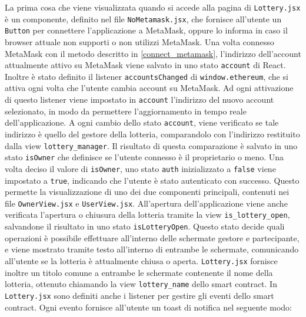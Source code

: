 \documentclass[12pt,a4paper,openright,twoside]{report}
\begin{document}
La prima cosa che viene visualizzata quando si accede alla pagina di \texttt{Lottery.jsx} è un componente, definito nel file \texttt{NoMetamask.jsx}, che fornisce all'utente un \texttt{Button} per connettere l'applicazione a MetaMask, oppure lo informa in caso il browser attuale non supporti o non utilizzi MetaMask. Una volta connesso MetaMask con il metodo descritto in \ref{connect_metamask}, l'indirizzo dell'account attualmente attivo su MetaMask viene salvato in uno stato \texttt{account} di React. Inoltre è stato definito il listener \texttt{accountsChanged} di \texttt{window.ethereum}, che si attiva ogni volta che l'utente cambia account su MetaMask. Ad ogni attivazione di questo listener viene impostato in \texttt{account} l'indirizzo del nuovo account selezionato, in modo da permettere l'aggiornamento in tempo reale dell'applicazione. A ogni cambio dello stato \texttt{account}, viene verificato se tale indirizzo è quello del gestore della lotteria, comparandolo con l'indirizzo restituito dalla view \texttt{lottery\_manager}. Il risultato di questa comparazione è salvato in uno stato \texttt{isOwner} che definisce se l'utente connesso è il proprietario o meno. Una volta deciso il valore di \texttt{isOwner}, uno stato \texttt{auth} inizializzato a \texttt{false} viene impostato a \texttt{true}, indicando che l'utente è stato autenticato con successo. Questo permette la visualizzazione di uno dei due componenti principali, contenuti nei file \texttt{OwnerView.jsx} e \texttt{UserView.jsx}. All'apertura dell'applicazione viene anche verificata l'apertura o chiusura della lotteria tramite la view \texttt{is\_lottery\_open}, salvandone il risultato in uno stato \texttt{isLotteryOpen}. Questo stato decide quali operazioni è possibile effettuare all'interno delle schermate gestore e partecipante, e viene mostrato tramite testo all'interno di entrambe le schermate, comunicando all'utente se la lotteria è attualmente chiusa o aperta. \texttt{Lottery.jsx} fornisce inoltre un titolo comune a entrambe le schermate contenente il nome della lotteria, ottenuto chiamando la view \texttt{lottery\_name} dello smart contract. In \texttt{Lottery.jsx} sono definiti anche i listener per gestire gli eventi dello smart contract. Ogni evento fornisce all'utente un toast di notifica nel seguente modo:
\end{document}
